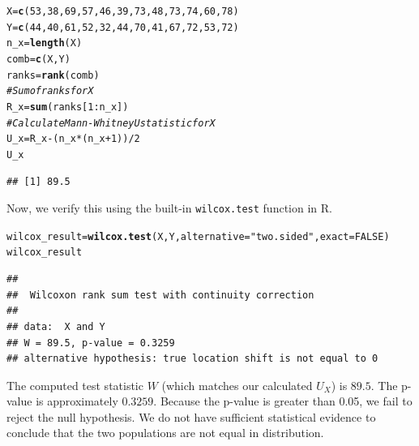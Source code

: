 \documentclass[12pt,english]{article}\usepackage[]{graphicx}\usepackage[]{xcolor}
\makeatletter
\newcommand{\hlnum}[1]{\textcolor[rgb]{0.686,0.059,0.569}{#1}}%
\newcommand{\hlsng}[1]{\textcolor[rgb]{0.192,0.494,0.8}{#1}}%
\newcommand{\hlcom}[1]{\textcolor[rgb]{0.678,0.584,0.686}{\textit{#1}}}%
\newcommand{\hlopt}[1]{\textcolor[rgb]{0,0,0}{#1}}%
\newcommand{\hldef}[1]{\textcolor[rgb]{0.345,0.345,0.345}{#1}}%
\newcommand{\hlkwb}[1]{\textcolor[rgb]{0.69,0.353,0.396}{#1}}%
\newcommand{\hlkwc}[1]{\textcolor[rgb]{0.333,0.667,0.333}{#1}}%
\newcommand{\hlkwd}[1]{\textcolor[rgb]{0.737,0.353,0.396}{\textbf{#1}}}%
\newenvironment{kframe}{%
 \def\at@end@of@kframe{}%
 \ifinner\ifhmode%
  \def\at@end@of@kframe{\end{minipage}}%
  \begin{minipage}{\columnwidth}%
 \fi\fi%
 \def\FrameCommand##1{\hskip\@totalleftmargin \hskip-\fboxsep
 \colorbox{shadecolor}{##1}\hskip-\fboxsep
     \hskip-\linewidth \hskip-\@totalleftmargin \hskip\columnwidth}%
 \MakeFramed {\advance\hsize-\width
   \@totalleftmargin\z@ \linewidth\hsize
   \@setminipage}}%
 {\par\unskip\endMakeFramed%
 \at@end@of@kframe}
\newenvironment{knitrout}{}{} %
\makeatother
\begin{document}
\begin{enumerate}[label=\arabic*.]
\begin{knitrout}
\color{fgcolor}\begin{kframe}
\begin{alltt}
\hldef{X} \hlkwb{=} \hlkwd{c}\hldef{(}\hlnum{53}\hldef{,} \hlnum{38}\hldef{,} \hlnum{69}\hldef{,} \hlnum{57}\hldef{,} \hlnum{46}\hldef{,} \hlnum{39}\hldef{,} \hlnum{73}\hldef{,} \hlnum{48}\hldef{,} \hlnum{73}\hldef{,} \hlnum{74}\hldef{,} \hlnum{60}\hldef{,} \hlnum{78}\hldef{)}
\hldef{Y} \hlkwb{=} \hlkwd{c}\hldef{(}\hlnum{44}\hldef{,} \hlnum{40}\hldef{,} \hlnum{61}\hldef{,} \hlnum{52}\hldef{,} \hlnum{32}\hldef{,} \hlnum{44}\hldef{,} \hlnum{70}\hldef{,} \hlnum{41}\hldef{,} \hlnum{67}\hldef{,} \hlnum{72}\hldef{,} \hlnum{53}\hldef{,} \hlnum{72}\hldef{)}
\hldef{n_x} \hlkwb{=} \hlkwd{length}\hldef{(X)}
\hldef{comb} \hlkwb{=} \hlkwd{c}\hldef{(X, Y)}
\hldef{ranks} \hlkwb{=} \hlkwd{rank}\hldef{(comb)}
\hlcom{#Sum of ranks for X}
\hldef{R_x} \hlkwb{=} \hlkwd{sum}\hldef{(ranks[}\hlnum{1}\hlopt{:}\hldef{n_x])}
\hlcom{#Calculate Mann-Whitney U statistic for X}
\hldef{U_x} \hlkwb{=} \hldef{R_x} \hlopt{-} \hldef{(n_x} \hlopt{*} \hldef{(n_x} \hlopt{+} \hlnum{1}\hldef{))} \hlopt{/} \hlnum{2}
\hldef{U_x}
\end{alltt}
\begin{verbatim}
## [1] 89.5
\end{verbatim}
\end{kframe}
\end{knitrout}
	Now, we verify this using the built-in \texttt{wilcox.test} function in R.
\begin{knitrout}
\color{fgcolor}\begin{kframe}
\begin{alltt}
\hldef{wilcox_result} \hlkwb{=} \hlkwd{wilcox.test}\hldef{(X, Y,} \hlkwc{alternative} \hldef{=} \hlsng{"two.sided"}\hldef{,} \hlkwc{exact} \hldef{=} \hlnum{FALSE}\hldef{)}
\hldef{wilcox_result}
\end{alltt}
\begin{verbatim}
## 
## 	Wilcoxon rank sum test with continuity correction
## 
## data:  X and Y
## W = 89.5, p-value = 0.3259
## alternative hypothesis: true location shift is not equal to 0
\end{verbatim}
\end{kframe}
\end{knitrout}
	The computed test statistic $W$ (which matches our calculated $U_X$) is $89.5$. The p-value is approximately $0.3259$. Because the p-value is greater than 0.05, we fail to reject the null hypothesis. We do not have sufficient statistical evidence to conclude that the two populations are not equal in distribution.

\end{enumerate}
\end{document}
